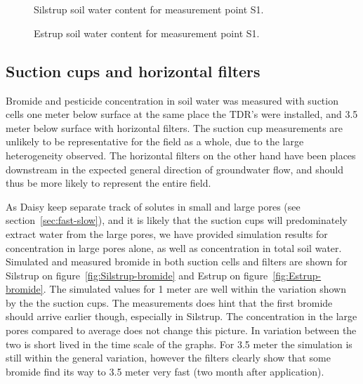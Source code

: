 \begin{figure}[htbp]
  \begin{center}
    \\
    \\
  \end{center}
  \caption{Silstrup soil water content for measurement point S1.}
  \label{fig:Silstrup-theta}
\end{figure}

\begin{figure}[htbp]
  \begin{center}
  \end{center}
  \caption{Estrup soil water content for measurement point S1.}
  \label{fig:Estrup-theta}
\end{figure}

\FloatBarrier
\subsection{Suction cups and horizontal filters}

Bromide and pesticide concentration in soil water was measured with
suction cells one meter below surface at the same place the TDR's were
installed, and 3.5 meter below surface with horizontal filters.  The
suction cup measurements are unlikely to be representative for the
field as a whole, due to the large heterogeneity observed.  The
horizontal filters on the other hand have been places downstream in
the expected general direction of groundwater flow, and should thus be
more likely to represent the entire field.

As Daisy keep separate track of solutes in small and large pores (see
section~\ref{sec:fast-slow}), and it is likely that the suction cups
will predominately extract water from the large pores, we have
provided simulation results for concentration in large pores alone, as
well as concentration in total soil water.  Simulated and measured
bromide in both suction cells and filters are shown for Silstrup on
figure~\ref{fig:Silstrup-bromide} and Estrup on
figure~\ref{fig:Estrup-bromide}.  The simulated values for 1 meter are
well within the variation shown by the the suction cups.  The
measurements does hint that the first bromide should arrive earlier
though, especially in Silstrup.  The concentration in the large pores
compared to average does not change this picture.  In variation
between the two is short lived in the time scale of the graphs.  For
3.5 meter the simulation is still within the general variation,
however the filters clearly show that some bromide find its way to 3.5
meter very fast (two month after application).

